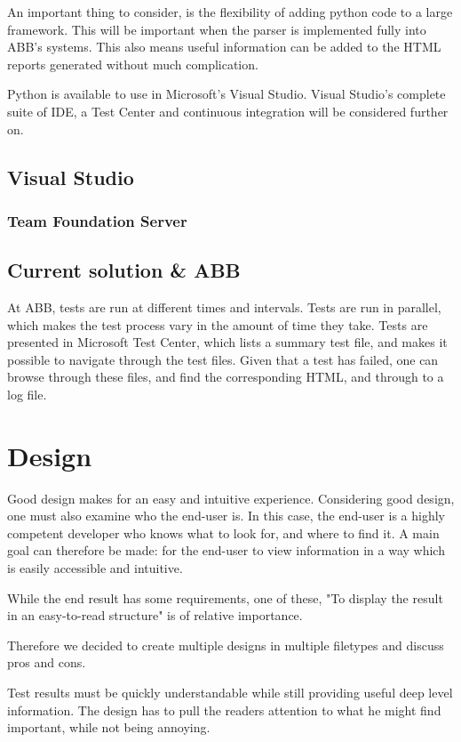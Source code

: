 \documentclass{article}
\begin{document}
	An important thing to consider, is the flexibility of adding python code to a large framework. This will be important when the parser is implemented fully into ABB's systems. This also means useful information can be added to the HTML reports generated without much complication. 
	
	Python is available to use in Microsoft's Visual Studio. Visual Studio's complete suite of IDE, a Test Center and continuous integration will be considered further on.
	\subsection{Visual Studio}
	\subsubsection{Team Foundation Server}
	
	\subsection{Current solution \& ABB}
	At ABB, tests are run at different times and intervals. Tests are run in parallel, which makes the test process vary in the amount of time they take. Tests are presented in Microsoft Test Center, which lists a summary test file, and makes it possible to navigate through the test files. Given that a test has failed, one can browse through these files, and find the corresponding HTML, and through to a log file. 
	
	
	\pagebreak
	
	\section{Design} \label{design}
	Good design makes for an easy and intuitive experience. Considering good design, one must also examine who the end-user is. In this case, the end-user is a highly competent developer who knows what to look for, and where to find it. A main goal can therefore be made: for the end-user to view information in a way which is easily accessible and intuitive. 
	
	While the end result has some requirements, one of these, "To display the result in an easy-to-read
	structure" is of relative importance.
	
	Therefore we decided to create multiple designs in multiple filetypes and discuss pros and cons.
	
	Test results must be quickly understandable while still providing useful deep level information.
	The design has to pull the readers attention to what he might find important, while not being annoying. 
	
\end{document}
